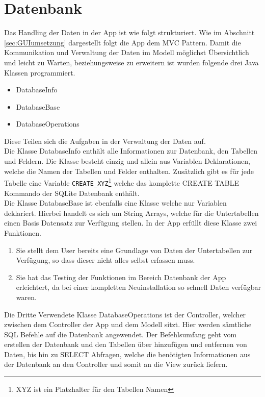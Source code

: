 \section{Datenbank}

Das Handling der Daten in der App ist wie folgt strukturiert. Wie im Abschnitt \ref{sec:GUIumsetzung} dargestellt folgt die App dem MVC Pattern. Damit die Kommunikation und Verwaltung der Daten im Modell möglichst Übersichtlich und leicht zu Warten, beziehungsweise zu erweitern ist wurden folgende drei Java Klassen programmiert.

\begin{itemize}
	\item DatabaseInfo
	\item DatabaseBase
	\item DatabaseOperations
\end{itemize}

Diese Teilen sich die Aufgaben in der Verwaltung der Daten auf. \\

Die Klasse DatabaseInfo enthält alle Informationen zur Datenbank, den Tabellen und Feldern. Die Klasse besteht einzig und allein aus Variablen Deklarationen, welche die Namen der Tabellen und Felder enthalten. Zusätzlich gibt es für jede Tabelle eine Variable \texttt{CREATE\_XYZ}\footnote{XYZ ist ein Platzhalter für den Tabellen Namen} welche das komplette CREATE TABLE Kommando der SQLite Datenbank enthält.\\

Die Klasse DatabaseBase ist ebenfalls eine Klasse welche nur Variablen deklariert. Hierbei handelt es sich um String Arrays, welche für die Untertabellen einen Basis Datensatz zur Verfügung stellen. In der App erfüllt diese Klasse zwei Funktionen.

\begin{enumerate}
	\item Sie stellt dem User bereits eine Grundlage von Daten der Untertabellen zur Verfügung, so dass dieser nicht alles selbst erfassen muss.
	\item Sie hat das Testing der Funktionen im Bereich Datenbank der App erleichtert, da bei einer kompletten Neuinstallation so schnell Daten verfügbar waren.
\end{enumerate}

Die Dritte Verwendete Klasse DatabaseOperations ist der Controller, welcher zwischen dem Controller der App und dem Modell sitzt. Hier werden sämtliche SQL Befehle auf die Datenbank angewendet. Der Befehlsumfang geht vom erstellen der Datenbank und den Tabellen über hinzufügen und entfernen von Daten, bis hin zu SELECT Abfragen, welche die benötigten Informationen aus der Datenbank an den Controller und somit an die View zurück liefern.\\



